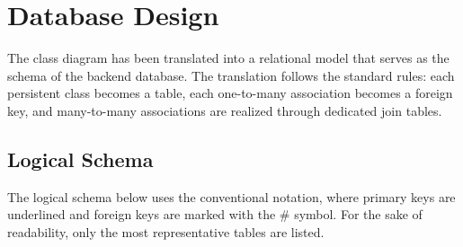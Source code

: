 \section{Database Design}

The class diagram has been translated into a relational model that serves as the schema of the backend database. The translation follows the standard rules: each persistent class becomes a table, each one-to-many association becomes a foreign key, and many-to-many associations are realized through dedicated join tables.

\subsection{Logical Schema}

The logical schema below uses the conventional notation, where primary keys are underlined and foreign keys are marked with the \# symbol. For the sake of readability, only the most representative tables are listed.

